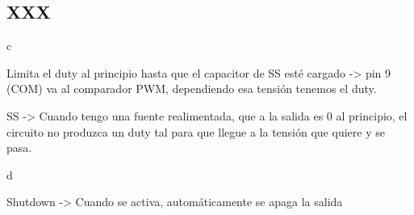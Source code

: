 %
%
%

\subsection{XXX}

c

Limita el duty al principio hasta que el capacitor de SS esté cargado -> pin 9 (COM) va al comparador PWM, dependiendo esa tensión tenemos el duty.

SS -> Cuando tengo una fuente realimentada, que a la salida es 0 al principio, el circuito no produzca un duty tal para que llegue  a la tensión que quiere y se pasa.

d

Shutdown -> Cuando se activa, automáticamente se apaga la salida



%